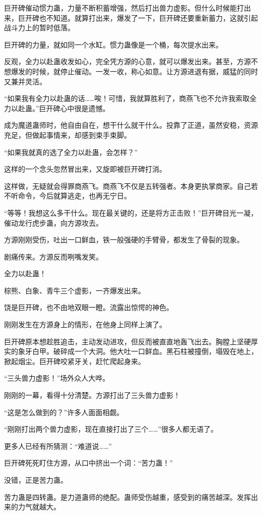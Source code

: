 \begin{this_body}
巨开碑催动惯力蛊，力量不断积蓄增强，然后打出兽力虚影。但什么时候能打出来，巨开碑也不知道。就算打出来，爆发了一下，巨开碑还要重新蓄力，这就引起战斗力上的暂时低落。

巨开碑的力量，就如同一个水缸。惯力蛊像是一个桶，每次提水出来。

反观，全力以赴蛊收发如心，完全凭方源的心意，就可以爆发出来。甚至，方源不想爆发的时候，就停止催动。一发一收，称心如意。让方源进退有据，威猛的同时又兼并灵活。

“如果我有全力以赴蛊的话……唉！可惜，我就算胜利了，商燕飞也不允许我索取全力以赴蛊。”巨开碑心中很是遗憾。

成为魔道蛊师时，他自由自在，想干什么就干什么。投靠了正道，虽然安稳，资源充足，但做起事情来，却感到束手束脚。

“如果我就真的选了全力以赴蛊，会怎样？”

这样的一个念头忽然冒出来，又旋即被巨开碑打消。

这样做，无疑就会得罪商燕飞。商燕飞不仅是五转强者。本身更执掌商家。自己若不听命令，今后就算逃走，也再无宁日。

“等等！我想这么多干什么。现在最关键的，还是将方正击败！”巨开碑目光一凝，催动龙行虎步蛊，向方源攻去。

方源刚刚受伤，吐出一口鲜血，铁一般强硬的手臂骨，都发生了骨裂的现象。

剧痛传来。方源反而咧嘴发笑。

全力以赴蛊！

棕熊、白象、青牛三个虚影，一齐爆发出来。

饶是巨开碑，也不由地双眼一瞪。流露出惊愕的神色。

刚刚发生在方源身上的情形，在他身上同样上演了。

巨开碑原本想趁胜追击，主动发动进攻，但反而被直直地轰飞出去。胸膛上坚硬厚实的象牙白甲。破碎成一个大洞。他大吐一口鲜血。黑石柱被撞倒，塌毁在地上，掀起烟尘。巨开碑咬紧牙关，赶忙爬起身来。

“三头兽力虚影！”场外众人大哗。

刚刚的一幕，看得十分清楚。方源打出了三头兽力虚影！

“这是怎么做到的？”许多人面面相觑。

“刚刚打出两个兽力虚影，现在直接打出了三个……”很多人都无语了。

更多人已经有所猜测：“难道说……”

巨开碑死死盯住方源，从口中挤出一个词：“苦力蛊！”

没错，正是苦力蛊。

苦力蛊是四转蛊。是力道蛊师的绝配。蛊师受伤越重，感受到的痛苦越深。发挥出来的力气就越大。


\end{this_body}
